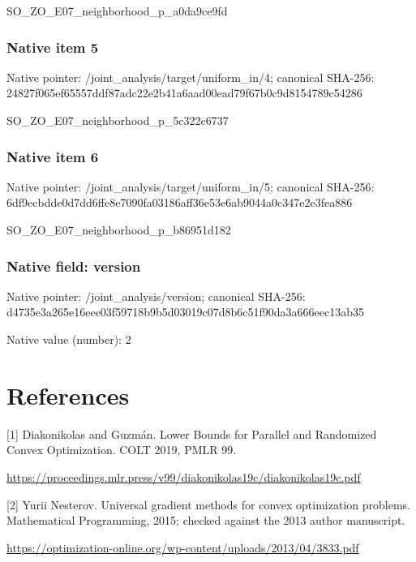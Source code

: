\documentclass[10pt,a4paper]{article}
\begin{document}
\begingroup\raggedright\sloppy SO\_\allowbreak{}ZO\_\allowbreak{}E07\_\allowbreak{}neighborhood\_\allowbreak{}p\_\allowbreak{}a0da9ce9fd\par\endgroup

\subsubsection{Native item 5}
Native pointer: /joint\_\allowbreak{}analysis/target/uniform\_\allowbreak{}in/4; canonical SHA-256: 24827f065ef65557ddf87adc22e2b41a6aad00ead79f67b0c9d8154789c54286

\begingroup\raggedright\sloppy SO\_\allowbreak{}ZO\_\allowbreak{}E07\_\allowbreak{}neighborhood\_\allowbreak{}p\_\allowbreak{}5c322c6737\par\endgroup

\subsubsection{Native item 6}
Native pointer: /joint\_\allowbreak{}analysis/target/uniform\_\allowbreak{}in/5; canonical SHA-256: 6df9ecbdde0d7dd6ffe8e7090fa03186aff36e53e6ab9044a0c347e2e3fea886

\begingroup\raggedright\sloppy SO\_\allowbreak{}ZO\_\allowbreak{}E07\_\allowbreak{}neighborhood\_\allowbreak{}p\_\allowbreak{}b86951d182\par\endgroup

\subsubsection{Native field: version}
Native pointer: /joint\_\allowbreak{}analysis/version; canonical SHA-256: d4735e3a265e16eee03f59718b9b5d03019c07d8b6c51f90da3a666eec13ab35

Native value (number): 2

\section{References}
[1] Diakonikolas and Guzmán. Lower Bounds for Parallel and Randomized Convex Optimization. COLT 2019, PMLR 99.

\url{https://proceedings.mlr.press/v99/diakonikolas19c/diakonikolas19c.pdf}

[2] Yurii Nesterov. Universal gradient methods for convex optimization problems. Mathematical Programming, 2015; checked against the 2013 author manuscript.

\url{https://optimization-online.org/wp-content/uploads/2013/04/3833.pdf}
\end{document}
